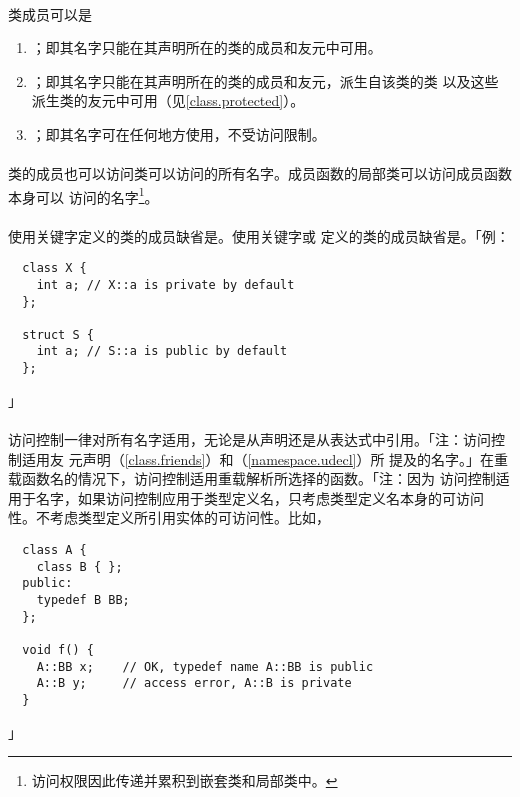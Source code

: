 
\paragraph{}
类成员可以是
\begin{enumerate}
  \item{；即其名字只能在其声明所在的类的成员和友元中可用。}
  \item{；即其名字只能在其声明所在的类的成员和友元，派生自该类的类
    以及这些派生类的友元中可用（见\ref{class.protected}）。}
  \item{；即其名字可在任何地方使用，不受访问限制。}
\end{enumerate}

\paragraph{}
类的成员也可以访问类可以访问的所有名字。成员函数的局部类可以访问成员函数本身可以
访问的名字\footnote{访问权限因此传递并累积到嵌套类和局部类中。}。

\paragraph{}
使用关键字定义的类的成员缺省是。使用关键字或
定义的类的成员缺省是。「例：
\begin{lstlisting}
  class X {
    int a; // X::a is private by default
  };

  struct S {
    int a; // S::a is public by default
  };
\end{lstlisting}」

\paragraph{}
访问控制一律对所有名字适用，无论是从声明还是从表达式中引用。「注：访问控制适用友
元声明（\ref{class.friends}）和（\ref{namespace.udecl}）所
提及的名字。」在重载函数名的情况下，访问控制适用重载解析所选择的函数。「注：因为
访问控制适用于名字，如果访问控制应用于类型定义名，只考虑类型定义名本身的可访问
性。不考虑类型定义所引用实体的可访问性。比如，
\begin{lstlisting}
  class A {
    class B { };
  public:
    typedef B BB;
  };

  void f() {
    A::BB x;    // OK, typedef name A::BB is public
    A::B y;     // access error, A::B is private
  }
\end{lstlisting}」

